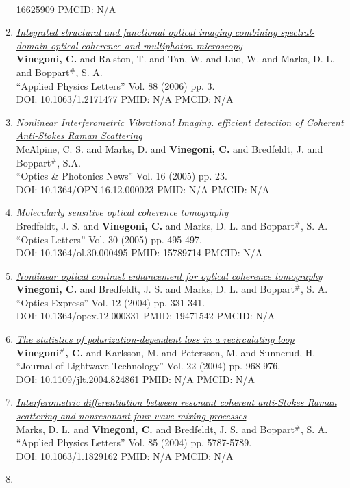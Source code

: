 \documentclass{resume}
\begin{document}
\begin{category}{~~}
\begin{enumerate}
16625909 PMCID: N/A\item \href{https://cvinegoni.github.io/assets/pdf/papers/2006-APL.pdf}{\it  Integrated structural and functional optical imaging combining spectral-domain optical coherence and multiphoton microscopy} \\ {\bf Vinegoni, C.} and Ralston, T. and Tan, W. and Luo, W. and Marks, D. L. and Boppart$^\#$, S. A. \\ ``Applied Physics Letters'' Vol. 88 (2006) pp. 3. \\ DOI: 10.1063/1.2171477 PMID: N/A PMCID: N/A\item \href{https://cvinegoni.github.io/assets/pdf/papers/2005-OPN.pdf}{\it  Nonlinear Interferometric Vibrational Imaging. efficient detection of Coherent Anti-Stokes Raman Scattering} \\ McAlpine, C. S. and Marks, D. and {\bf Vinegoni, C.} and Bredfeldt, J. and Boppart$^\#$, S.A. \\ ``Optics \& Photonics News'' Vol. 16 (2005) pp. 23. \\ DOI: 10.1364/OPN.16.12.000023 PMID: N/A PMCID: N/A\item \href{https://cvinegoni.github.io/assets/pdf/papers/2005-OL.pdf}{\it  Molecularly sensitive optical coherence tomography} \\ Bredfeldt, J. S. and {\bf Vinegoni, C.} and Marks, D. L. and Boppart$^\#$, S. A. \\ ``Optics Letters'' Vol. 30 (2005) pp. 495-497. \\ DOI: 10.1364/ol.30.000495 PMID: 15789714 PMCID: N/A\item \href{https://cvinegoni.github.io/assets/pdf/papers/2004-OE.pdf}{\it  Nonlinear optical contrast enhancement for optical coherence tomography} \\ {\bf Vinegoni, C.} and Bredfeldt, J. S. and Marks, D. L. and Boppart$^\#$, S. A. \\ ``Optics Express'' Vol. 12 (2004) pp. 331-341. \\ DOI: 10.1364/opex.12.000331 PMID: 19471542 PMCID: N/A\item \href{https://cvinegoni.github.io/assets/pdf/papers/2004-JLT.pdf}{\it  The statistics of polarization-dependent loss in a recirculating loop} \\ {\bf Vinegoni$^\#$, C.} and Karlsson, M. and Petersson, M. and Sunnerud, H. \\ ``Journal of Lightwave Technology'' Vol. 22 (2004) pp. 968-976. \\ DOI: 10.1109/jlt.2004.824861 PMID: N/A PMCID: N/A\item \href{https://cvinegoni.github.io/assets/pdf/papers/2004-APL.pdf}{\it  Interferometric differentiation between resonant coherent anti-Stokes Raman scattering and nonresonant four-wave-mixing processes} \\ Marks, D. L. and {\bf Vinegoni, C.} and Bredfeldt, J. S. and Boppart$^\#$, S. A. \\ ``Applied Physics Letters'' Vol. 85 (2004) pp. 5787-5789. \\ DOI: 10.1063/1.1829162 PMID: N/A PMCID: N/A\item 
\end{enumerate}
\end{category}
\end{document}
